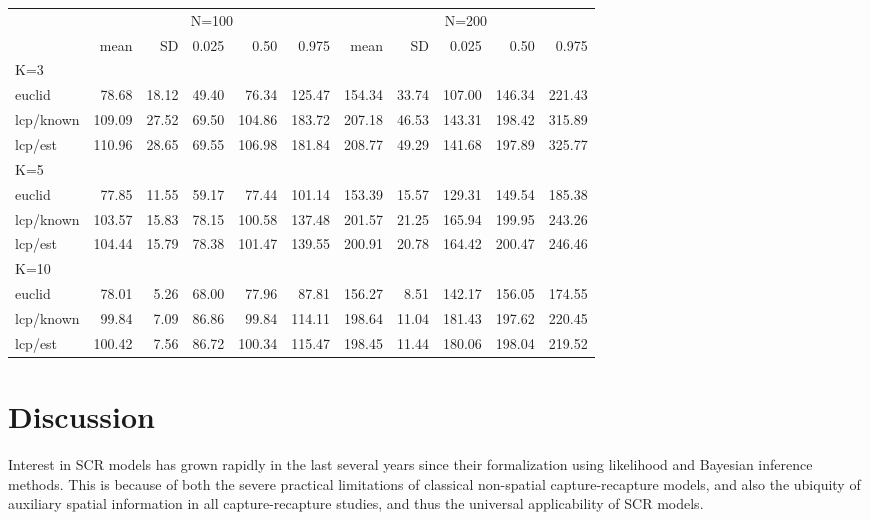 \documentclass[12pt]{article}
\begin{document}
\begin{table}[ht]
{\begin{tabular}{l|rrrrrrrrrr}
         & \multicolumn{5}{c}{N=100  } & \multicolumn{5}{c}{N=200   }  \\
         &   mean &  SD  & 0.025 & 0.50  & 0.975  & mean  & SD   & 0.025 & 0.50  & 0.975 \\ \hline
K=3      &        &      &       &       &        &       &      &       &       &       \\
euclid   &  78.68 & 18.12& 49.40 & 76.34 & 125.47 & 154.34& 33.74& 107.00& 146.34& 221.43\\
lcp/known& 109.09 & 27.52& 69.50 &104.86 & 183.72 & 207.18& 46.53& 143.31& 198.42& 315.89\\
lcp/est  & 110.96 & 28.65& 69.55 &106.98 & 181.84 & 208.77& 49.29& 141.68& 197.89& 325.77\\
K=5      &        &      &       &       &        &       &      &       &       &        \\
euclid   &  77.85 & 11.55& 59.17 & 77.44 & 101.14 & 153.39& 15.57& 129.31& 149.54& 185.38\\
lcp/known& 103.57 & 15.83& 78.15 &100.58 & 137.48 & 201.57& 21.25& 165.94& 199.95& 243.26\\
lcp/est  & 104.44 & 15.79& 78.38 &101.47 & 139.55 & 200.91& 20.78& 164.42& 200.47& 246.46\\
K=10     &        &      &       &       &        &       &      &       &       &       \\
euclid   &  78.01 & 5.26 & 68.00 & 77.96 & 87.81  & 156.27&  8.51& 142.17& 156.05& 174.55\\
lcp/known&  99.84 & 7.09 & 86.86 & 99.84 & 114.11 & 198.64& 11.04& 181.43& 197.62& 220.45\\
lcp/est  & 100.42 & 7.56 & 86.72 &100.34 & 115.47 & 198.45& 11.44& 180.06& 198.04& 219.52\\ \hline
\end{tabular}
}
\label{tab.results1}
\end{table}





\section{Discussion}

Interest in SCR models has grown rapidly in the last several years
since their formalization using likelihood \citep{borchers_efford:2008}
and Bayesian \citep{royle_young:2008} inference methods. This is because
of both the severe practical limitations of classical non-spatial
capture-recapture models, and also the ubiquity of auxiliary spatial
information in all capture-recapture studies, and thus the universal
applicability of SCR models.
\end{document}
